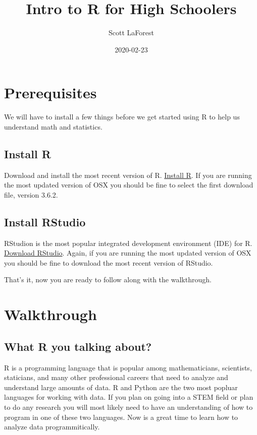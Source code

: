 \documentclass[]{book}
\title{Intro to R for High Schoolers}
\author{Scott LaForest}
\date{2020-02-23}
\begin{document}
\maketitle

{
\setcounter{tocdepth}{1}
\tableofcontents
}
\chapter{Prerequisites}\label{prerequisites}

We will have to install a few things before we get started using R to
help us understand math and statistics.

\section{Install R}\label{install-r}

Download and install the most recent version of R.
\href{https://cran.rstudio.com/}{Install R}. If you are running the most
updated version of OSX you should be fine to select the first download
file, version 3.6.2.

\section{Install RStudio}\label{install-rstudio}

RStudion is the most popular integrated development environment (IDE)
for R.
\href{https://rstudio.com/products/rstudio/download/\#download}{Download
RStudio}. Again, if you are running the most updated version of OSX you
should be fine to download the most recent version of RStudio.

That's it, now you are ready to follow along with the walkthrough.

\chapter{Walkthrough}\label{walkthrough}

\section{What R you talking about?}\label{what-r-you-talking-about}

R is a programming language that is popular among mathematicians,
scientists, staticians, and many other professional careers that need to
analyze and understand large amounts of data. R and Python are the two
most popluar languages for working with data. If you plan on going into
a STEM field or plan to do any research you will most likely need to
have an understanding of how to program in one of these two languages.
Now is a great time to learn how to analyze data programmitically.
\end{document}
